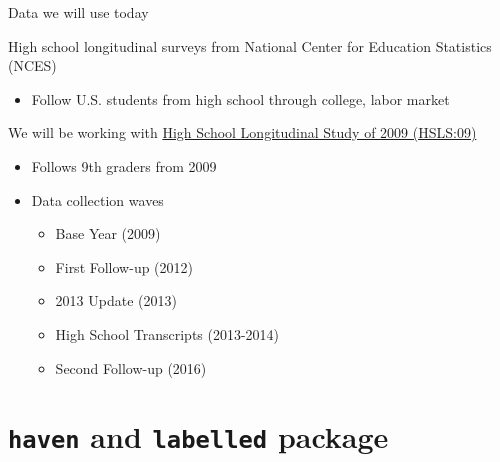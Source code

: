 \documentclass[8pt,ignorenonframetext,dvipsnames]{beamer}
\providecommand{\tightlist}{%
  \setlength{\itemsep}{0pt}\setlength{\parskip}{0pt}}
\begin{document}
\begin{frame}{Data we will use today}

High school longitudinal surveys from National Center for Education
Statistics (NCES)

\begin{itemize}
\tightlist
\item
  Follow U.S. students from high school through college, labor market
\end{itemize}

We will be working with
\href{https://nces.ed.gov/surveys/hsls09/index.asp}{High School
Longitudinal Study of 2009 (HSLS:09)}

\begin{itemize}
\tightlist
\item
  Follows 9th graders from 2009
\item
  Data collection waves

  \begin{itemize}
  \tightlist
  \item
    Base Year (2009)
  \item
    First Follow-up (2012)
  \item
    2013 Update (2013)
  \item
    High School Transcripts (2013-2014)
  \item
    Second Follow-up (2016)
  \end{itemize}
\end{itemize}

\end{frame}

\section{\texorpdfstring{\texttt{haven} and \texttt{labelled}
package}{haven and labelled package}}\label{haven-and-labelled-package}
\end{document}
